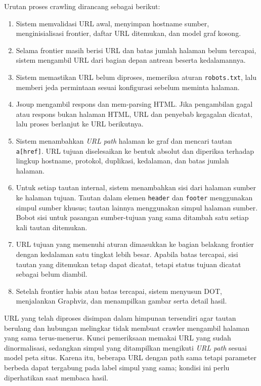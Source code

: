 Urutan proses crawling dirancang sebagai berikut:
\begin{enumerate}
    \item Sistem memvalidasi URL awal, menyimpan hostname sumber, menginisialisasi frontier, daftar URL ditemukan, dan model graf kosong.
    \item Selama frontier masih berisi URL dan batas jumlah halaman belum tercapai, sistem mengambil URL dari bagian depan antrean beserta kedalamannya.
    \item Sistem memastikan URL belum diproses, memeriksa aturan \texttt{robots.txt}, lalu memberi jeda permintaan sesuai konfigurasi sebelum meminta halaman.
    \item Jsoup mengambil respons dan mem-parsing HTML. Jika pengambilan gagal atau respons bukan halaman HTML, URL dan penyebab kegagalan dicatat, lalu proses berlanjut ke URL berikutnya.
    \item Sistem menambahkan \textit{URL path} halaman ke graf dan mencari tautan \texttt{a[href]}. URL tujuan diselesaikan ke bentuk absolut dan diperiksa terhadap lingkup hostname, protokol, duplikasi, kedalaman, dan batas jumlah halaman.
    \item Untuk setiap tautan internal, sistem menambahkan sisi dari halaman sumber ke halaman tujuan. Tautan dalam elemen \texttt{header} dan \texttt{footer} menggunakan simpul sumber khusus; tautan lainnya menggunakan simpul halaman sumber. Bobot sisi untuk pasangan sumber-tujuan yang sama ditambah satu setiap kali tautan ditemukan.
    \item URL tujuan yang memenuhi aturan dimasukkan ke bagian belakang frontier dengan kedalaman satu tingkat lebih besar. Apabila batas tercapai, sisi tautan yang ditemukan tetap dapat dicatat, tetapi status tujuan dicatat sebagai belum diambil.
    \item Setelah frontier habis atau batas tercapai, sistem menyusun DOT, menjalankan Graphviz, dan menampilkan gambar serta detail hasil.
\end{enumerate}

URL yang telah diproses disimpan dalam himpunan tersendiri agar tautan berulang dan hubungan melingkar tidak membuat crawler mengambil halaman yang sama terus-menerus. Kunci pemeriksaan memakai URL yang sudah dinormalisasi, sedangkan simpul yang ditampilkan mengikuti \textit{URL path} sesuai model peta situs. Karena itu, beberapa URL dengan path sama tetapi parameter berbeda dapat tergabung pada label simpul yang sama; kondisi ini perlu diperhatikan saat membaca hasil.

